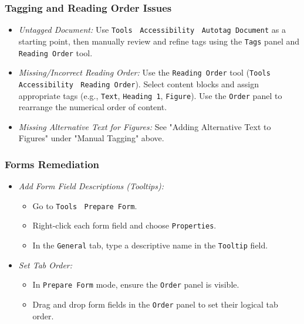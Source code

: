 \subsubsection{Tagging and Reading Order Issues}
\label{subsubsec:tagging-reading-order}

\begin{itemize}
\item \emph{Untagged Document:} Use \texttt{Tools} $\>$ \texttt{Accessibility} $\>$ \texttt{Autotag Document} as a starting point, then manually review and refine tags using the \texttt{Tags} panel and \texttt{Reading Order} tool.
\item \emph{Missing/Incorrect Reading Order:} Use the \texttt{Reading Order} tool (\texttt{Tools} $\>$ \texttt{Accessibility} $\>$ \texttt{Reading Order}). Select content blocks and assign appropriate tags (e.g., \texttt{Text}, \texttt{Heading 1}, \texttt{Figure}). Use the \texttt{Order} panel to rearrange the numerical order of content.
\item \emph{Missing Alternative Text for Figures:} See "Adding Alternative Text to Figures" under "Manual Tagging" above.
\end{itemize}

\subsubsection{Forms Remediation}
\label{subsubsec:forms-remediation}

\begin{itemize}
\item \emph{Add Form Field Descriptions (Tooltips):}
    \begin{itemize}
    \item Go to \texttt{Tools} $\>$ \texttt{Prepare Form}.
    \item Right-click each form field and choose \texttt{Properties}.
    \item In the \texttt{General} tab, type a descriptive name in the \texttt{Tooltip} field.
    \end{itemize}
\item \emph{Set Tab Order:}
    \begin{itemize}
    \item In \texttt{Prepare Form} mode, ensure the \texttt{Order} panel is visible.
    \item Drag and drop form fields in the \texttt{Order} panel to set their logical tab order.
    \end{itemize}
\end{itemize}

